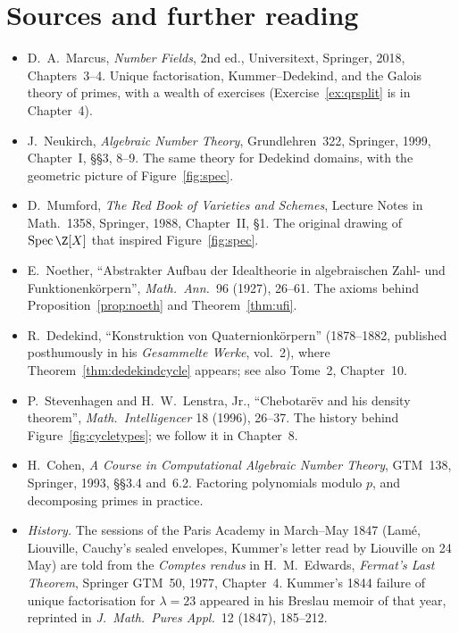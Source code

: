 \section*{Sources and further reading}

\begin{itemize}
\item D.~A.~Marcus, \emph{Number Fields}, 2nd ed., Universitext, Springer, 2018, Chapters~3--4. Unique factorisation,
Kummer--Dedekind, and the Galois theory of primes, with a wealth of exercises (Exercise~\ref{ex:qrsplit} is in Chapter~4).
\item J.~Neukirch, \emph{Algebraic Number Theory}, Grundlehren~322, Springer, 1999, Chapter~I, \S\S3, 8--9. The same
theory for Dedekind domains, with the geometric picture of Figure~\ref{fig:spec}.
\item D.~Mumford, \emph{The Red Book of Varieties and Schemes}, Lecture Notes in Math.~1358, Springer, 1988, Chapter~II,
\S1. The original drawing of $\operatorname{Spec}\Z[X]$ that inspired Figure~\ref{fig:spec}.
\item E.~Noether, ``Abstrakter Aufbau der Idealtheorie in algebraischen Zahl- und Funktionenk\"orpern'',
\emph{Math.\ Ann.}\ 96 (1927), 26--61. The axioms behind Proposition~\ref{prop:noeth} and Theorem~\ref{thm:ufi}.
\item R.~Dedekind, ``Konstruktion von Quaternionk\"orpern'' (1878--1882, published posthumously in his \emph{Gesammelte
Werke}, vol.~2), where Theorem~\ref{thm:dedekindcycle} appears; see also Tome~2, Chapter~10.
\item P.~Stevenhagen and H.~W.~Lenstra, Jr., ``Chebotar\"ev and his density theorem'', \emph{Math.\ Intelligencer}
18 (1996), 26--37. The history behind Figure~\ref{fig:cycletypes}; we follow it in Chapter~8.
\item H.~Cohen, \emph{A Course in Computational Algebraic Number Theory}, GTM~138, Springer, 1993, \S\S3.4 and~6.2.
Factoring polynomials modulo $p$, and decomposing primes in practice.
\item \emph{History.} The sessions of the Paris Academy in March--May 1847 (Lam\'e, Liouville, Cauchy's sealed envelopes,
Kummer's letter read by Liouville on 24 May) are told from the \emph{Comptes rendus} in H.~M.~Edwards, \emph{Fermat's Last
Theorem}, Springer GTM~50, 1977, Chapter~4. Kummer's 1844 failure of unique factorisation for $\lambda=23$ appeared in his
Breslau memoir of that year, reprinted in \emph{J.\ Math.\ Pures Appl.}\ 12 (1847), 185--212.
\end{itemize}
